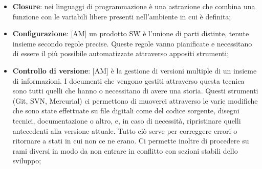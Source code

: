 \begin{itemize}
		\item \textbf{Closure}: nei linguaggi di programmazione è una astrazione che combina una funzione con le variabili libere presenti nell'ambiente in cui è definita;
		\item \textbf{Configurazione}: [AM] un prodotto SW è l'unione di parti distinte, tenute insieme secondo regole precise. Queste regole vanno pianificate e necessitano di essere il più possibile automatizzate attraverso appositi strumenti;
		\item \textbf{Controllo di versione}: [AM]  è la gestione di versioni multiple di un insieme di informazioni. I documenti che vengono gestiti attraverso questa tecnica sono tutti quelli che hanno o necessitano di avere una storia.\newline
	Questi strumenti (Git, SVN, Mercurial) ci permettono di muoverci attraverso le varie modifiche che sono state effettuate su file digitali come del codice sorgente, disegni tecnici, documentazione o altro, e, in caso di necessità, ripristinare quelli antecedenti alla versione attuale. \newline
	Tutto ciò serve per correggere errori o ritornare a stati in cui non ce ne erano. Ci permette inoltre di procedere su rami diversi in modo da non entrare in conflitto con sezioni stabili dello sviluppo;

	\end{itemize}